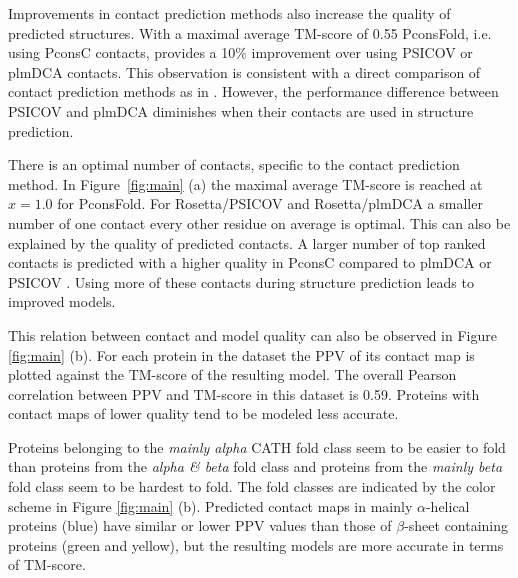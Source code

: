 \documentclass{bioinfo}
\begin{document}
Improvements in contact prediction methods also increase the quality
of predicted structures. With a maximal average TM-score of 0.55
PconsFold, i.e. using PconsC contacts, provides a 10\% improvement
over using PSICOV or plmDCA contacts. This observation is consistent
with a direct comparison of contact prediction methods as in
\citeauthor{skwark_PconsC:_2013}
\citeyear{skwark_PconsC:_2013}. However, the performance difference
between PSICOV and plmDCA diminishes when their contacts are used in
structure prediction. 


There is an optimal number of contacts, specific to the contact
prediction method. In Figure~\ref{fig:main} (a) the maximal average
TM-score is reached at $x=1.0$ for PconsFold. For Rosetta/PSICOV and
Rosetta/plmDCA a smaller number of one contact every other residue on
average is optimal. This can also be explained by the quality of
predicted contacts. A larger number of top ranked contacts is
predicted with a higher quality in PconsC compared to plmDCA or PSICOV
\cite[]{skwark_PconsC:_2013}. Using more of these contacts during
structure prediction leads to improved models. 


This relation between contact and model quality can also be observed
in Figure \ref{fig:main} (b). For each protein in the dataset the PPV
of its contact map is plotted against the TM-score of the resulting
model. The overall Pearson correlation between PPV and TM-score in
this dataset is 0.59. Proteins with contact maps of lower quality tend
to be modeled less accurate. 


Proteins belonging to the {\it
  mainly alpha} CATH fold class seem to be easier to fold than
proteins from the {\it alpha \& beta} fold class and proteins from the
{\it mainly beta} fold class seem to be hardest to fold. The fold
classes are indicated by the color scheme in Figure \ref{fig:main}
(b). Predicted contact maps in mainly $\alpha$-helical proteins (blue)
have similar or lower PPV values than those of $\beta$-sheet
containing proteins (green and yellow), but the resulting models are
more accurate in terms of TM-score.
\end{document}
